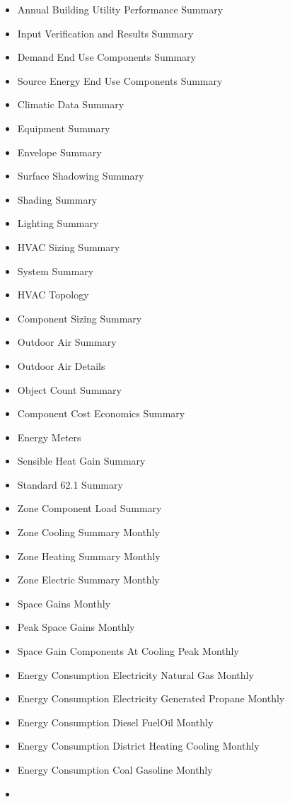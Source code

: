 \begin{itemize}
\item
  Annual Building Utility Performance Summary
\item
  Input Verification and Results Summary
\item
  Demand End Use Components Summary
\item
  Source Energy End Use Components Summary
\item
  Climatic Data Summary
\item
  Equipment Summary
\item
  Envelope Summary
\item
  Surface Shadowing Summary
\item
  Shading Summary
\item
  Lighting Summary
\item
  HVAC Sizing Summary
\item
  System Summary
\item
  HVAC Topology
\item
  Component Sizing Summary
\item
  Outdoor Air Summary
\item
  Outdoor Air Details
\item
  Object Count Summary
\item
  Component Cost Economics Summary
\item
  Energy Meters
\item
  Sensible Heat Gain Summary
\item
  Standard 62.1 Summary
\item
  Zone Component Load Summary
\item
  Zone Cooling Summary Monthly
\item
  Zone Heating Summary Monthly
\item
  Zone Electric Summary Monthly
\item
  Space Gains Monthly
\item
  Peak Space Gains Monthly
\item
  Space Gain Components At Cooling Peak Monthly
\item
  Energy Consumption Electricity Natural Gas Monthly
\item
  Energy Consumption Electricity Generated Propane Monthly
\item
  Energy Consumption Diesel FuelOil Monthly
\item
  Energy Consumption District Heating Cooling Monthly
\item
  Energy Consumption Coal Gasoline Monthly
\item

\end{itemize}
